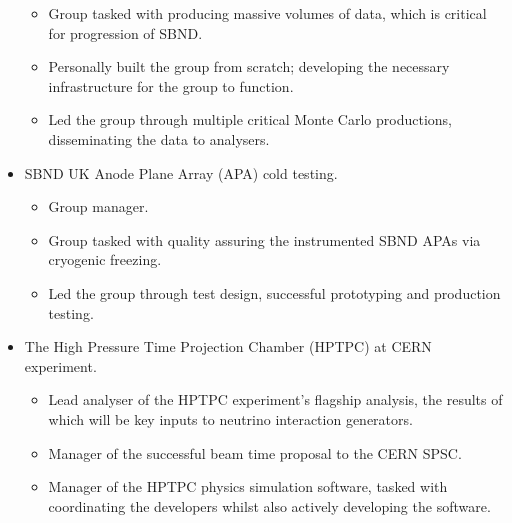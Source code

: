 \documentclass[margin,line]{res}
\begin{document}
\begin{resume}
\begin{itemize}
\begin{itemize}
\item Group tasked with producing massive volumes of data,  which is critical for progression of SBND.
\item Personally built the group from scratch; developing the necessary infrastructure for the group to function.
\item Led the group through multiple critical Monte Carlo productions, disseminating the data to analysers.
\end{itemize}
\item SBND UK Anode Plane Array (APA) cold testing.
\begin{itemize}
\item Group manager.
\item Group tasked with quality assuring the instrumented SBND APAs via cryogenic freezing.
\item Led the group through test design, successful prototyping and production testing.
\end{itemize}
\item The High Pressure Time Projection Chamber (HPTPC) at CERN experiment.
\begin{itemize}
\item Lead analyser of the HPTPC experiment's flagship analysis, the results of which will be key inputs to neutrino interaction generators.
\item Manager of the successful beam time proposal to the CERN SPSC. 
\item Manager of the HPTPC physics simulation software, tasked with coordinating the developers whilst also actively developing the software.
\end{itemize}
\end{itemize}






\end{resume}
\end{document}
